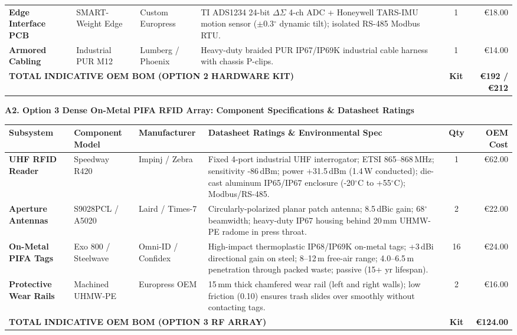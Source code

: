 \documentclass[10pt,a4paper]{article}
\begin{document}
\begin{tcolorbox}[colback=white, colframe=bordergray, arc=3pt, boxsep=2pt, left=5pt, right=5pt, top=3pt, bottom=3pt]
{\begin{tabularx}{\textwidth}{l p{2.2cm} p{1.8cm} X c r}
\textbf{Edge Interface PCB} & SMART-Weight Edge & Custom Europress & TI ADS1234 24-bit $\Delta\Sigma$ 4-ch ADC + Honeywell TARS-IMU motion sensor ($\pm$0.3$^\circ$ dynamic tilt); isolated RS-485 Modbus RTU. & 1 & \euro{}18.00 \\
\textbf{Armored Cabling} & Industrial PUR M12 & Lumberg / Phoenix & Heavy-duty braided PUR IP67/IP69K industrial cable harness with chassis P-clips. & 1 & \euro{}14.00 \\
\midrule
\multicolumn{4}{l}{\textbf{TOTAL INDICATIVE OEM BOM (OPTION 2 HARDWARE KIT)}} & \textbf{Kit} & \textbf{\euro{}192 / \euro{}212} \\
\bottomrule
\end{tabularx}
}
\end{tcolorbox}
\vspace{-3pt}

\begin{tcolorbox}[colback=white, colframe=bordergray, arc=3pt, boxsep=2pt, left=5pt, right=5pt, top=3pt, bottom=3pt]
{\fontsize{7.5pt}{8.5pt}\selectfont \textbf{\color{techpurple}A2. Option 3 Dense On-Metal PIFA RFID Array: Component Specifications \& Datasheet Ratings}}\\[2pt]
{\fontsize{6.5pt}{7.8pt}\selectfont
\begin{tabularx}{\textwidth}{l p{2.2cm} p{1.8cm} X c r}
\toprule
\textbf{Subsystem} & \textbf{Component Model} & \textbf{Manufacturer} & \textbf{Datasheet Ratings \& Environmental Spec} & \textbf{Qty} & \textbf{OEM Cost} \\
\midrule
\textbf{UHF RFID Reader} & Speedway R420 & Impinj / Zebra & Fixed 4-port industrial UHF interrogator; ETSI 865--868\,MHz; sensitivity -86\,dBm; power +31.5\,dBm (1.4\,W conducted); die-cast aluminum IP65/IP67 enclosure (-20$^\circ$C to +55$^\circ$C); Modbus/RS-485. & 1 & \euro{}62.00 \\
\textbf{Aperture Antennas} & S9028PCL / A5020 & Laird / Times-7 & Circularly-polarized planar patch antenna; 8.5\,dBic gain; 68$^\circ$ beamwidth; heavy-duty IP67 housing behind 20\,mm UHMW-PE radome in press throat. & 2 & \euro{}22.00 \\
\textbf{On-Metal PIFA Tags} & Exo 800 / Steelwave & Omni-ID / Confidex & High-impact thermoplastic IP68/IP69K on-metal tags; +3\,dBi directional gain on steel; 8--12\,m free-air range; 4.0--6.5\,m penetration through packed waste; passive (15+ yr lifespan). & 16 & \euro{}24.00 \\
\textbf{Protective Wear Rails} & Machined UHMW-PE & Europress OEM & 15\,mm thick chamfered wear rail (left and right walls); low friction (0.10) ensures trash slides over smoothly without contacting tags. & 2 & \euro{}16.00 \\
\midrule
\multicolumn{4}{l}{\textbf{TOTAL INDICATIVE OEM BOM (OPTION 3 RF ARRAY)}} & \textbf{Kit} & \textbf{\euro{}124.00} \\
\bottomrule
\end{tabularx}
}
\end{tcolorbox}
\vspace{-3pt}
\end{document}
